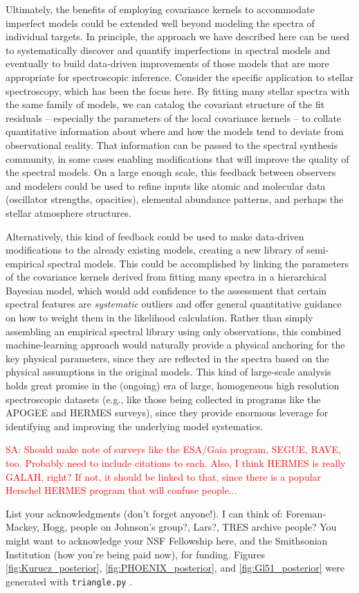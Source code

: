 \documentclass[iop,floatfix]{emulateapj}
\newcommand{\comm}[1]{ \textcolor{red}{SA: #1}}
\begin{document}
Ultimately, the benefits of employing covariance kernels to accommodate imperfect models could 
be extended well beyond modeling the spectra of individual targets.  In principle, the approach we 
have described here can be used to systematically discover and quantify imperfections in spectral 
models and eventually to build data-driven improvements of those models that are more appropriate 
for spectroscopic inference.  Consider the specific application to stellar spectroscopy, which has 
been the focus here.  By fitting many stellar spectra with the same family of models, we can 
catalog the covariant structure of the fit residuals -- especially the parameters of the local 
covariance kernels -- to collate quantitative information about where and how the models tend to 
deviate from observational reality.  That information can be passed to the spectral synthesis 
community, in some cases enabling modifications that will improve the quality of the spectral 
models.  On a large enough scale, this feedback between observers and modelers could be used to 
refine inputs like atomic and molecular data (oscillator strengths, opacities), elemental abundance 
patterns, and perhaps the stellar atmosphere structures.

Alternatively, this kind of feedback could be used to make data-driven modifications to the already 
existing models, creating a new library of semi-empirical spectral models.  This could be 
accomplished by linking the parameters of the covariance kernels derived from fitting many spectra 
in a hierarchical Bayesian model, which would add confidence to the assessment that certain 
spectral features are {\it systematic} outliers and offer general quantitative guidance on how to 
weight them in the likelihood calculation.  Rather than simply assembling an empirical spectral 
library using only observations, this combined machine-learning approach would naturally provide a 
physical anchoring for the key physical parameters, since they are reflected in the spectra based 
on the physical assumptions in the original models.  This kind of large-scale analysis holds great 
promise in the (ongoing) era of large, homogeneous high resolution spectroscopic datasets (e.g., 
like those being collected in programs like the APOGEE and HERMES surveys), since they provide 
enormous leverage for identifying and improving the underlying model systematics.

\comm{Should make note of surveys like the ESA/Gaia program, SEGUE, RAVE, too.  Probably need to 
include citations to each.  Also, I think HERMES is really GALAH, right?  If not, it should be 
linked to that, since there is a popular Herschel HERMES program that will confuse people...}


\acknowledgments  List your acknowledgments (don't forget anyone!).  I can think of: 
Foreman-Mackey, Hogg, people on Johnson's group?, Lars?, TRES archive people?  You might want to 
acknowledge your NSF Fellowship here, and the Smithsonian Institution (how you're being paid now), 
for funding.  Figures \ref{fig:Kurucz_posterior}, \ref{fig:PHOENIX_posterior}, and \ref{fig:Gl51_posterior} were generated with \texttt{triangle.py} \citep{foreman-mackey14}.




\end{document}
